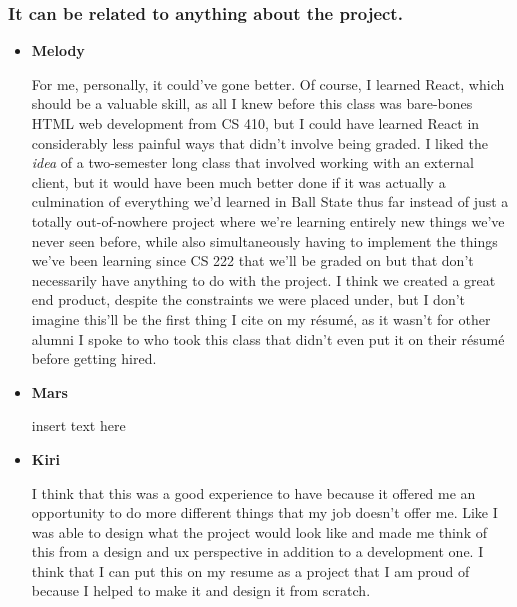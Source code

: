 \documentclass[12pt, letterpaper]{article}
\begin{document}
\subsubsection{It can be related to anything about the project.}
\begin{itemize}
	\item{\textbf{Melody}}
	
		For me, personally, it could've gone better. Of course, I learned React, which should be a valuable skill, 
		as all I knew before this class was bare-bones HTML web development from CS 410, but I could have learned 
		React in considerably less painful ways that didn't involve being graded. I liked the \emph{idea} of a 
		two-semester long class that involved working with an external client, but it would have been much better 
		done if it was actually a culmination of everything we'd learned in Ball State thus far instead of just 
		a totally out-of-nowhere project where we're learning entirely new things we've never seen before, while 
		also simultaneously having to implement the things we've been learning since CS 222 that we'll be graded on but that 
		don't necessarily have anything to do with the project. I think we created a great end product, despite the 
		constraints we were placed under, but I don't imagine this'll be the first thing I cite on my résumé, as it 
		wasn't for other alumni I spoke to who took this class that didn't even put it on their résumé before getting 
		hired.
	
	\item{\textbf{Mars}}
	
		insert text here
	
	\item{\textbf{Kiri}}
	
		I think that this was a good experience to have because it offered me an opportunity to do more different things that my job doesn't offer me. Like I was able to design what the project would look like and made me think of this from a design and ux perspective in addition to a development one. I think that I can put this on my resume as a project that I am proud of because I helped to make it and design it from scratch.
\end{itemize}
\end{document}
